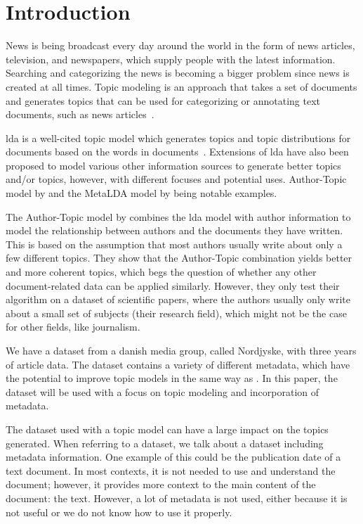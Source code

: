 \section{Introduction}\label{sec:introduction}
News is being broadcast every day around the world in the form of news articles, television, and newspapers, which supply people with the latest information.
Searching and categorizing the news is becoming a bigger problem since news is created at all times.
Topic modeling is an approach that takes a set of documents and generates topics that can be used for categorizing or annotating text documents, such as news articles~\cite{Probabilistic_Topic_Models}.

\Gls{lda} is a well-cited topic model which generates topics and topic distributions for documents based on the words in documents~\cite{blei2003latent}.
Extensions of \gls{lda} have also been proposed to model various other information sources to generate better topics and/or topics, however, with different focuses and potential uses.
Author-Topic model by \citet{author_topic_2012} and the MetaLDA model by \citet{MetaLDA2017} being notable examples.

The Author-Topic model by \citet{author_topic_2012} combines the \gls{lda} model with author information to model the relationship between authors and the documents they have written.
This is based on the assumption that most authors usually write about only a few different topics.
They show that the Author-Topic combination yields better and more coherent topics, which begs the question of whether any other document-related data can be applied similarly.
However, they only test their algorithm on a dataset of scientific papers, where the authors usually only write about a small set of subjects (their research field), which might not be the case for other fields, like journalism.

We have a dataset from a danish media group, called Nordjyske, with three years of article data.
The dataset contains a variety of different metadata, which have the potential to improve topic models in the same way as \citet{author_topic_2012}. 
In this paper, the dataset will be used with a focus on topic modeling and incorporation of metadata.

The dataset used with a topic model can have a large impact on the topics generated.
When referring to a dataset, we talk about a dataset including metadata information.
One example of this could be the publication date of a text document. 
In most contexts, it is not needed to use and understand the document; however, it provides more context to the main content of the document: the text.
However, a lot of metadata is not used, either because it is not useful or we do not know how to use it properly. 

